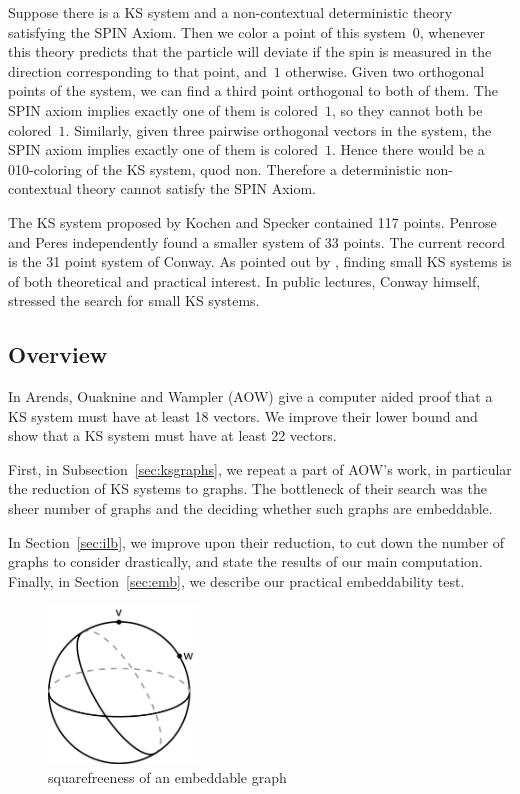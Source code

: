 \documentclass[adraft,copyright,creativecommons]{eptcs}
\newcounter{main}
\theoremstyle{definition}
\theoremstyle{remark}
\begin{document}
Suppose there is a KS system and a non-contextual deterministic theory satisfying
the SPIN Axiom.
Then we color a point of this system~$0$,
whenever this theory predicts that the particle will deviate
if the spin is measured in the direction corresponding to that
point, and~$1$ otherwise.
Given two orthogonal points of the system,
we can find a third point orthogonal to both of them.
The SPIN axiom implies exactly one of them is colored~$1$, so they
cannot both be colored~$1$.
Similarly, given three pairwise orthogonal vectors in the system,
the SPIN axiom implies exactly one of them is colored~$1$.
Hence there would be a 010-coloring of the KS system, quod non.
Therefore a deterministic non-contextual theory cannot satisfy the
SPIN Axiom.

The KS system proposed by Kochen and Specker contained 117 points\cite{ks}.
Penrose and Peres\cite{peres} independently found a smaller system of 33 points.
The current record is the 31 point system of Conway\cite[p.~197]{qtcm}.
As pointed out by \cite{c00,aow11}, finding small KS systems
is of both theoretical and practical interest.
In public lectures, Conway himself, stressed the search for small KS
systems.\cite{OC}

\subsection{Overview}
In \cite{aow11} Arends, Ouaknine and Wampler (AOW) give a computer aided proof
that a KS system must have at least 18 vectors.  We improve their lower bound
and show that a KS system must have at least 22 vectors.

First, in Subsection~\ref{sec:ksgraphs},
we repeat a part of AOW's work, in particular the reduction of
KS systems to graphs.
The bottleneck of their search was the sheer number of graphs
and the deciding whether such graphs are embeddable.

In Section~\ref{sec:ilb},
we improve upon their reduction,
to cut down the number of graphs to consider drastically,
and state the results of our main computation.
Finally, in Section~\ref{sec:emb},
we describe our practical embeddability test.

\begin{figure}
\begin{center}
\includegraphics[width=40mm]{../graphs/kruisproduct.pdf}
\end{center}
\caption{squarefreeness of an embeddable graph
\label{fig:crossproduct}}
\end{figure}
\end{document}
